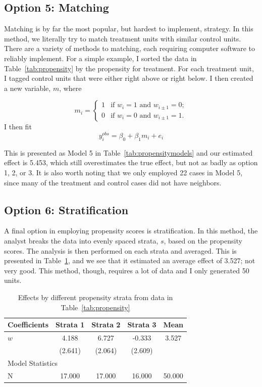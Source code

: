 \subsection{Option 5: Matching}

Matching is by far the most popular, but hardest to implement, strategy. In this method, we literally try to match treatment units with similar control units. There are a variety of methods to matching, each requiring computer software to reliably implement. For a simple example, I sorted the data in Table~\ref{tab:propensity} by the propensity for treatment. For each treatment unit, I tagged control units that were either right above or right below. I then created a new variable, $m$, where

\begin{equation}
m_i = \left\{ \begin{array}{ll}
     1 & \mbox{if $w_i = 1$ and $w_{i\pm 1} = 0$};\\
     0 &\mbox{if $w_i = 0$ and $w_{i\pm 1} = 1$}.\end{array} \right.
\end{equation}
I then fit
\[
y_i^{obs}=\beta_0+\beta_1m_i+e_i
\]

This is presented as Model 5 in Table~\ref{tab:propensitymodels} and our estimated effect is 5.453, which still overestimates the true effect, but not as badly as option 1, 2, or 3. It is also worth noting that we only employed 22 cases in Model 5, since many of the treatment and control cases did not have neighbors.

\subsection{Option 6: Stratification}

A final option in employing propensity scores is stratification. In this method, the analyst breaks the data into evenly spaced strata, $s$, based on the propensity scores. The analysis is then performed on each strata and averaged. This is presented in Table~\ref{tab:propensitystrata}, and we see that it estimated an average effect of 3.527; not very good. This method, though, requires a lot of data and I only generated 50 units.

\begin{table}[htbp]\centering
\caption{Effects by different propensity strata from data in Table~\ref{tab:propensity}
\label{tab:propensitystrata}}
\begin{tabular}{lcccc}
\hline
Coefficients&Strata 1&Strata 2&Strata 3 &Mean \\
\hline
$w$      &    4.188  &    6.727 &   -0.333 & 3.527  \\
      &   (2.641)  &   (2.064)  &   (2.609)  \\
\hline
\multicolumn{4}{l}{Model Statistics} \\
\hline
N 	&   17.000  &   17.000  &   16.000 & 50.000 \\
\hline
\end{tabular}
\end{table}

